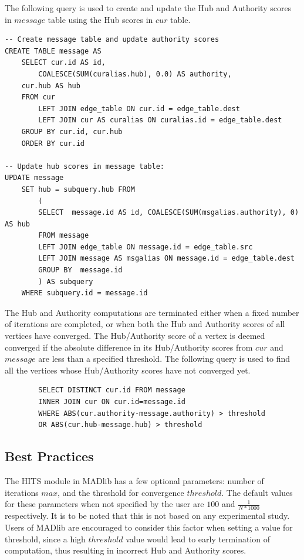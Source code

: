 The following query is used to create and update the Hub and Authority scores
in $message$ table using the Hub scores in $cur$ table.

\begin{algorithm}
\label{alg:hits:update}
\begin{lstlisting}
-- Create message table and update authority scores
CREATE TABLE message AS
	SELECT cur.id AS id,
		COALESCE(SUM(curalias.hub), 0.0) AS authority,
	cur.hub AS hub
	FROM cur
        LEFT JOIN edge_table ON cur.id = edge_table.dest
        LEFT JOIN cur AS curalias ON curalias.id = edge_table.dest
	GROUP BY cur.id, cur.hub
	ORDER BY cur.id

-- Update hub scores in message table:
UPDATE message
	SET hub = subquery.hub FROM
		(
		SELECT  message.id AS id, COALESCE(SUM(msgalias.authority), 0) AS hub
		FROM message
		LEFT JOIN edge_table ON message.id = edge_table.src
		LEFT JOIN message AS msgalias ON message.id = edge_table.dest
		GROUP BY  message.id
		) AS subquery
	WHERE subquery.id = message.id

\end{lstlisting}
\end{algorithm}


The Hub and Authority computations are terminated either when a fixed number of
iterations are completed, or when both the Hub and Authority scores of all
vertices have converged. The Hub/Authority score of a vertex is deemed
converged if the absolute difference in its Hub/Authority scores from $cur$ and
$message$ are less than a specified threshold.
The following query is used to find all the vertices whose Hub/Authority scores
have not converged yet.
\begin{algorithm}
\label{alg:hits:update1}
\begin{lstlisting}
		SELECT DISTINCT cur.id FROM message
		INNER JOIN cur ON cur.id=message.id
		WHERE ABS(cur.authority-message.authority) > threshold
		OR ABS(cur.hub-message.hub) > threshold
\end{lstlisting}
\end{algorithm}

\subsection{Best Practices} \label{sec:hits:bestpractices}

The HITS module in MADlib has a few optional parameters: number of iterations $max$,
and the threshold for convergence $threshold$.
The default values for these parameters when not specified by the user are $100$
and $\frac{1}{N*1000}$ respectively.
It is to be noted that this is not based on any experimental study. Users of
MADlib are encouraged to consider this factor when setting a value for threshold,
since a high $threshold$ value would lead to early termination of computation,
thus resulting in incorrect Hub and Authority scores.
